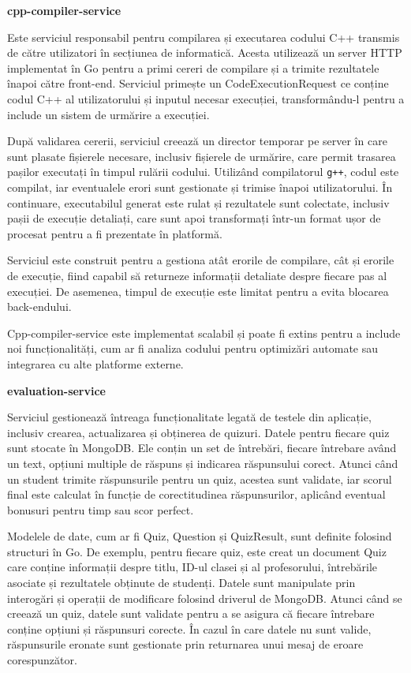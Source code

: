 \textbf{cpp-compiler-service}

Este serviciul responsabil pentru compilarea și executarea 
codului C++ transmis de către utilizatori în secțiunea de informatică.
Acesta utilizează un server HTTP implementat în Go 
pentru a primi cereri de compilare și a trimite rezultatele înapoi 
către front-end. Serviciul primește un CodeExecutionRequest 
ce conține codul C++ al utilizatorului și inputul necesar execuției, 
transformându-l pentru a include un sistem de urmărire a execuției.

După validarea cererii, serviciul creează un director temporar pe server 
în care sunt plasate fișierele necesare, inclusiv fișierele de urmărire, 
care permit trasarea pașilor executați în timpul rulării codului. Utilizând 
compilatorul \texttt{g++}, codul este compilat, iar eventualele erori sunt gestionate 
și trimise înapoi utilizatorului. În continuare, executabilul generat este rulat 
și rezultatele sunt colectate, inclusiv pașii de execuție detaliați, care sunt 
apoi transformați într-un format ușor de procesat pentru a fi prezentate în 
platformă.

Serviciul este construit pentru a gestiona atât erorile de compilare, cât și 
erorile de execuție, fiind capabil să returneze informații detaliate despre 
fiecare pas al execuției. De asemenea, timpul de execuție 
este limitat pentru a evita blocarea back-endului.

Cpp-compiler-service este implementat scalabil și poate fi extins 
pentru a include noi funcționalități, cum ar fi analiza codului pentru optimizări 
automate sau integrarea cu alte platforme externe.

\textbf{evaluation-service}

Serviciul gestionează întreaga funcționalitate 
legată de testele din aplicație, inclusiv crearea, actualizarea și obținerea
de quizuri. Datele pentru fiecare quiz sunt stocate în MongoDB. Ele conțin un 
set de întrebări, fiecare întrebare având un text, opțiuni multiple de
răspuns și indicarea răspunsului corect. Atunci când un student trimite
răspunsurile pentru un quiz, acestea sunt validate, iar scorul final
este calculat în funcție de corectitudinea răspunsurilor, aplicând
eventual bonusuri pentru timp sau scor perfect.

Modelele de date, cum ar fi Quiz, Question și 
QuizResult, sunt definite folosind structuri în Go. De exemplu,
pentru fiecare quiz, este creat un document Quiz care conține 
informații despre titlu, ID-ul clasei și al profesorului, întrebările 
asociate și rezultatele obținute de studenți. Datele sunt manipulate 
prin interogări și operații de modificare folosind driverul de MongoDB.
Atunci când se creează un quiz, datele sunt validate pentru a se 
asigura că fiecare întrebare conține opțiuni și răspunsuri corecte. 
În cazul în care datele nu sunt valide, răspunsurile eronate sunt
gestionate prin returnarea unui mesaj de eroare corespunzător.

